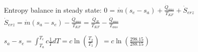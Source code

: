 Entropy balance in steady state:  
0 = \( \dot{m} (s_e - s_a) + \frac{\dot{Q}_{aus}}{T_{KF}} + \dot{S}_{erz} \)  
\( \dot{S}_{erz} = \dot{m} (s_a - s_e) - \frac{\dot{Q}_{aus}}{T_{KF}} = \frac{\dot{Q}_{R}}{T_{KF}} - \frac{\dot{Q}_{aus}}{T_{aus}} \)  

\( s_a - s_e = \int_{T_a}^{T_e} c \frac{1}{T} dT = c \ln \left( \frac{T_2}{T_1} \right) \)  
\( = c \ln \left( \frac{298.15}{288.15} \right) \)